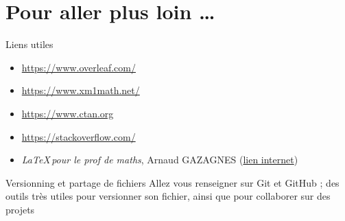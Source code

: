 \section[Pour aller plus loin \dots]{Pour aller plus loin \dots}

\begin{frame}{Liens utiles}
    \begin{itemize}[label=$\triangleright$]
        \item \href{https://www.overleaf.com/learn/latex/Tutorials}{https://www.overleaf.com/}
        \item \href{https://www.xm1math.net/texmaker/doc_fr.html}{https://www.xm1math.net/}
        \item \href{https://www.ctan.org}{https://www.ctan.org}
        \item \href{https://stackoverflow.com/}{https://stackoverflow.com/}
        \item \textit{\LaTeX \,pour le prof de maths}, Arnaud GAZAGNES (\href{http://math.univ-lyon1.fr/irem/IMG/pdf/LatexPourLeProfDeMaths.pdf}{lien internet})
    \end{itemize}
\end{frame}

\begin{frame}{Versionning et partage de fichiers}
    Allez vous renseigner sur Git et GitHub ; des outils très utiles pour versionner son fichier, ainsi que pour collaborer sur des projets
\end{frame}